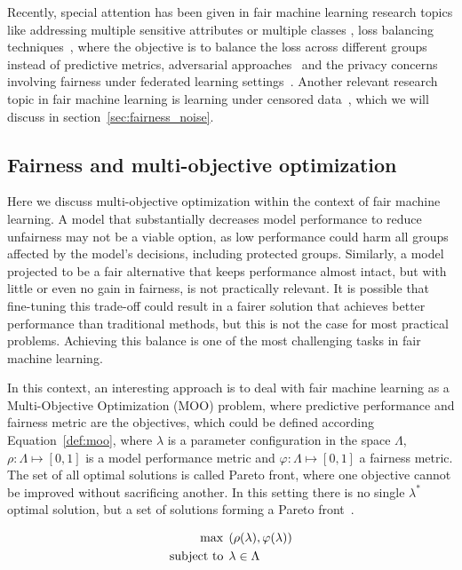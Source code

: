Recently, special attention has been given in fair machine learning research topics like addressing multiple sensitive attributes or multiple classes \cite{DAloisio2023,Liu_Wang_Wang_Wang_Su_Gao_2023}, loss balancing techniques~\cite{KIM2023231,KhaliliZA23}, where the objective is to balance the loss across different groups instead of predictive metrics, adversarial approaches~\cite{Liang2023,ZhangZLZY23,GrariLD23,MousaviMD23,Zeming2023,Yuchen2023} and the privacy concerns involving fairness under federated learning settings~\cite{ChenZZZY24,VucinichZ23}. Another relevant research topic in fair machine learning is learning under censored data~\cite{WZhang2022,WZhang2023_a,WZhang2023_b,WZhang2023_c}, which we will discuss in section~\ref{sec:fairness_noise}.


\subsection{Fairness and multi-objective optimization}

Here we discuss multi-objective optimization within the context of fair machine learning. A model that substantially decreases model performance to reduce unfairness may not be a viable option, as low performance could harm all groups affected by the model's decisions, including protected groups. Similarly, a model projected to be a fair alternative that keeps performance almost intact, but with little or even no gain in fairness, is not practically relevant. It is possible that fine-tuning this trade-off could result in a fairer solution that achieves better performance than traditional methods, but this is not the case for most practical problems. Achieving this balance is one of the most challenging tasks in fair machine learning.

In this context, an interesting approach is to deal with fair machine learning as a Multi-Objective Optimization (MOO) problem, where predictive performance and fairness metric are the objectives, which could be defined according Equation~\ref{def:moo}, where $\lambda$ is a parameter configuration in the space $\Lambda$, $\rho: \Lambda \mapsto [0,1]$ is a model performance metric and $\varphi: \Lambda \mapsto [0,1]$ a fairness metric. The set of all optimal solutions is called Pareto front, where one objective cannot be improved without sacrificing another. In this setting there is no single $\lambda^*$ optimal solution, but a set of solutions forming a Pareto front~\citep{pareto1906manuale}.

\begin{align}\label{def:moo}
\max &\hspace{1ex} (\rho(\lambda), \varphi(\lambda)) \\
\text{subject to} &\hspace{1ex} \lambda\in\Lambda \nonumber
\end{align}

